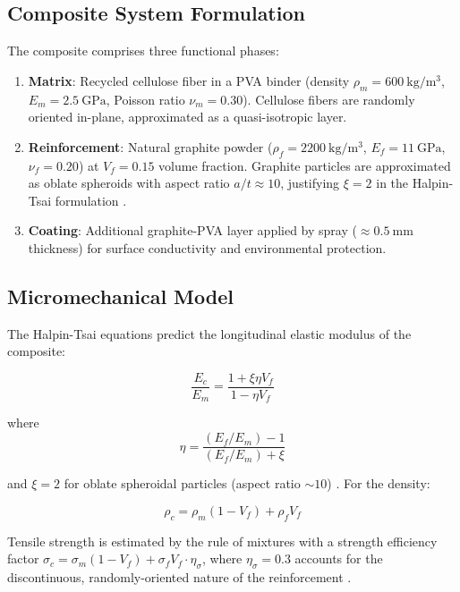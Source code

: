 \documentclass[twocolumn]{article}
\begin{document}
\subsection{Composite System Formulation}

The composite comprises three functional phases:
\begin{enumerate}
    \item \textbf{Matrix}: Recycled cellulose fiber in a PVA binder (density $\rho_m = \SI{600}{\kilogram\per\cubic\meter}$, $E_m = \SI{2.5}{\giga\pascal}$, Poisson ratio $\nu_m = 0.30$). Cellulose fibers are randomly oriented in-plane, approximated as a quasi-isotropic layer.
    \item \textbf{Reinforcement}: Natural graphite powder ($\rho_f = \SI{2200}{\kilogram\per\cubic\meter}$, $E_f = \SI{11}{\giga\pascal}$, $\nu_f = 0.20$) at $V_f = 0.15$ volume fraction. Graphite particles are approximated as oblate spheroids with aspect ratio $a/t \approx 10$, justifying $\xi = 2$ in the Halpin-Tsai formulation \cite{halpin1976,chung2023}.
    \item \textbf{Coating}: Additional graphite-PVA layer applied by spray ($\approx \SI{0.5}{\milli\meter}$ thickness) for surface conductivity and environmental protection.
\end{enumerate}

\subsection{Micromechanical Model}

The Halpin-Tsai \cite{halpin1976} equations predict the longitudinal elastic modulus of the composite:

\begin{equation}
\label{eq:halpin-tsai}
\frac{E_c}{E_m} = \frac{1 + \xi \eta V_f}{1 - \eta V_f}
\end{equation}

where
\begin{equation}
\eta = \frac{(E_f/E_m) - 1}{(E_f/E_m) + \xi}
\end{equation}

and $\xi = 2$ for oblate spheroidal particles (aspect ratio $\sim 10$) \cite{halpin1976}. For the density:

\begin{equation}
\rho_c = \rho_m(1 - V_f) + \rho_f V_f
\end{equation}

Tensile strength is estimated by the rule of mixtures with a strength efficiency factor $\sigma_c = \sigma_m(1 - V_f) + \sigma_f V_f \cdot \eta_\sigma$, where $\eta_\sigma = 0.3$ accounts for the discontinuous, randomly-oriented nature of the reinforcement \cite{callister2018}.
\end{document}
